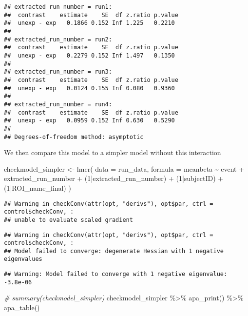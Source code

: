 \documentclass[
]{article}
\newenvironment{Shaded}{\begin{snugshade}}{\end{snugshade}}
\newcommand{\AttributeTok}[1]{\textcolor[rgb]{0.77,0.63,0.00}{#1}}
\newcommand{\CommentTok}[1]{\textcolor[rgb]{0.56,0.35,0.01}{\textit{#1}}}
\newcommand{\DecValTok}[1]{\textcolor[rgb]{0.00,0.00,0.81}{#1}}
\newcommand{\FunctionTok}[1]{\textcolor[rgb]{0.00,0.00,0.00}{#1}}
\newcommand{\NormalTok}[1]{#1}
\newcommand{\OtherTok}[1]{\textcolor[rgb]{0.56,0.35,0.01}{#1}}
\newcommand{\SpecialCharTok}[1]{\textcolor[rgb]{0.00,0.00,0.00}{#1}}
\begin{document}
\begin{verbatim}
## extracted_run_number = run1:
##  contrast    estimate    SE  df z.ratio p.value
##  unexp - exp   0.1866 0.152 Inf 1.225   0.2210 
## 
## extracted_run_number = run2:
##  contrast    estimate    SE  df z.ratio p.value
##  unexp - exp   0.2279 0.152 Inf 1.497   0.1350 
## 
## extracted_run_number = run3:
##  contrast    estimate    SE  df z.ratio p.value
##  unexp - exp   0.0124 0.155 Inf 0.080   0.9360 
## 
## extracted_run_number = run4:
##  contrast    estimate    SE  df z.ratio p.value
##  unexp - exp   0.0959 0.152 Inf 0.630   0.5290 
## 
## Degrees-of-freedom method: asymptotic
\end{verbatim}

We then compare this model to a simpler model without this interaction

\begin{Shaded}
\begin{Highlighting}[]
\NormalTok{checkmodel\_simpler }\OtherTok{\textless{}{-}} \FunctionTok{lmer}\NormalTok{(}
  \AttributeTok{data =}\NormalTok{ run\_data,}
  \AttributeTok{formula =}\NormalTok{ meanbeta }\SpecialCharTok{\textasciitilde{}}\NormalTok{ event }\SpecialCharTok{+}\NormalTok{ extracted\_run\_number }\SpecialCharTok{+}\NormalTok{ (}\DecValTok{1}\SpecialCharTok{|}\NormalTok{extracted\_run\_number) }\SpecialCharTok{+}\NormalTok{ (}\DecValTok{1}\SpecialCharTok{|}\NormalTok{subjectID) }\SpecialCharTok{+}\NormalTok{ (}\DecValTok{1}\SpecialCharTok{|}\NormalTok{ROI\_name\_final)}
\NormalTok{)}
\end{Highlighting}
\end{Shaded}

\begin{verbatim}
## Warning in checkConv(attr(opt, "derivs"), opt$par, ctrl = control$checkConv, :
## unable to evaluate scaled gradient
\end{verbatim}

\begin{verbatim}
## Warning in checkConv(attr(opt, "derivs"), opt$par, ctrl = control$checkConv, :
## Model failed to converge: degenerate Hessian with 1 negative eigenvalues
\end{verbatim}

\begin{verbatim}
## Warning: Model failed to converge with 1 negative eigenvalue: -3.8e-06
\end{verbatim}

\begin{Shaded}
\begin{Highlighting}[]
\CommentTok{\# summary(checkmodel\_simpler)}
\NormalTok{checkmodel\_simpler }\SpecialCharTok{\%\textgreater{}\%}
  \FunctionTok{apa\_print}\NormalTok{() }\SpecialCharTok{\%\textgreater{}\%}
  \FunctionTok{apa\_table}\NormalTok{()}
\end{Highlighting}
\end{Shaded}
\end{document}
